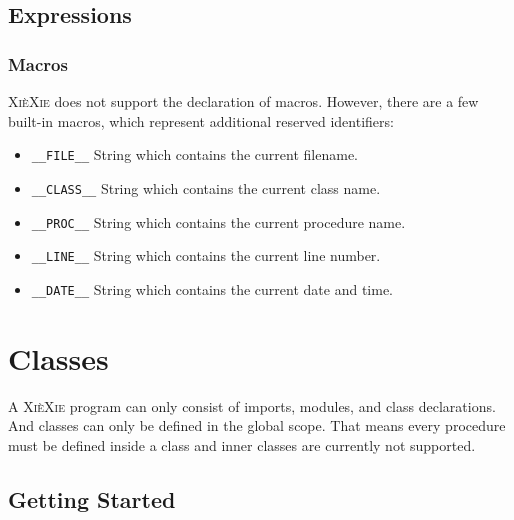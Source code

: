 \documentclass{report}
\def\xiexie{\textsc{Xi\`eXie}\xspace}
\begin{document}

\section{Expressions}

\subsection{Macros}

\xiexie does not support the declaration of macros. However, there are a few built-in macros, which represent additional
reserved identifiers:
\begin{itemize}
	\item \texttt{\_\_FILE\_\_} String which contains the current filename.
	\item \texttt{\_\_CLASS\_\_} String which contains the current class name.
	\item \texttt{\_\_PROC\_\_} String which contains the current procedure name.
	\item \texttt{\_\_LINE\_\_} String which contains the current line number.
	\item \texttt{\_\_DATE\_\_} String which contains the current date and time.
\end{itemize}




\chapter{Classes}
\label{ch:classes}

A \xiexie program can only consist of imports, modules, and class declarations. And classes can only be defined
in the global scope. That means every procedure must be defined inside a class and inner classes are currently not supported.



\section{Getting Started}
\end{document}
